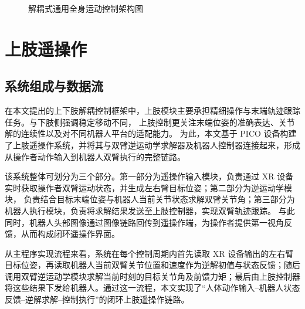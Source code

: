 \begin{figure}[H]
    \caption{解耦式通用全身运动控制架构图}
    \label{fig:decoupled_framework}
\end{figure}


\section{上肢遥操作}

\subsection{系统组成与数据流}

在本文提出的上下肢解耦控制框架中，上肢模块主要承担精细操作与末端轨迹跟踪任务。与下肢侧强调稳定移动不同，
上肢控制更关注末端位姿的准确表达、关节解的连续性以及对不同机器人平台的适配能力。
为此，本文基于 PICO 设备构建了上肢遥操作系统，并将其与双臂逆运动学求解器及机器人控制器连接起来，形成从操作者动作输入到机器人双臂执行的完整链路。

该系统整体可划分为三个部分。第一部分为遥操作输入模块，负责通过 XR 设备实时获取操作者双臂运动状态，并生成左右臂目标位姿；第二部分为逆运动学模块，
负责结合目标末端位姿与机器人当前关节状态求解双臂关节角；第三部分为机器人执行模块，负责将求解结果发送至上肢控制器，实现双臂轨迹跟踪。
与此同时，机器人头部图像通过图像链路回传到遥操作端，为操作者提供第一视角反馈，从而构成闭环遥操作界面。

从主程序实现流程来看，系统在每个控制周期内首先读取 XR 设备输出的左右臂目标位姿，再读取机器人当前双臂关节位置和速度作为逆解初值与状态反馈；随后调用双臂逆运动学模块求解当前时刻的目标关节角及前馈力矩；最后由上肢控制器将这些结果下发给机器人。通过这一流程，本文实现了“人体动作输入--机器人状态反馈--逆解求解--控制执行”的闭环上肢遥操作链路。

